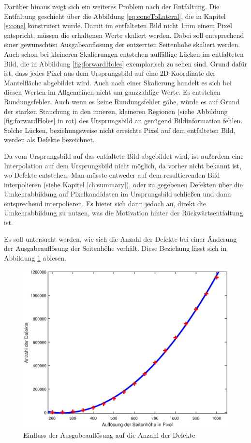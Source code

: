 Darüber hinaus zeigt sich ein weiteres Problem nach der Entfaltung. Die Entfaltung geschieht über die Abbildung \ref{eq:coneToLateral}, die in Kapitel \ref{s:cone} konstruiert wurde.
Damit im entfalteten Bild nicht 1mm einem Pixel entspricht, müssen die erhaltenen Werte skaliert werden. Dabei soll entsprechend einer gewünschten Ausgabeauflösung der entzerrten Seitenhöhe skaliert werden.
Auch schon bei kleineren Skalierungen entstehen auffällige Lücken im entfalteten Bild, die in Abbildung \ref{fig:forwardHoles} exemplarisch zu sehen sind. Grund dafür ist, dass jedes Pixel aus dem Ursprungsbild auf eine 2D-Koordinate der Mantelfläche abgebildet wird. Auch nach einer Skalierung handelt es sich bei diesen Werten im Allgemeinen nicht um ganzzahlige Werte. Es entstehen Rundungsfehler. Auch wenn es keine Rundungsfehler gäbe, würde es auf Grund der starken Stauchung in den inneren, kleineren Regionen (siehe Abbildung \ref{fig:forwardHoles} in rot) des Ursprungsbild an genügend Bildinformation fehlen. Solche Lücken, beziehungsweise nicht erreichte Pixel auf dem entfalteten Bild, werden als Defekte bezeichnet.

Da vom Ursprungsbild auf das entfaltete Bild abgebildet wird, ist außerdem eine Interpolation auf dem Ursprungsbild nicht möglich, da vorher nicht bekannt ist, wo Defekte entstehen. Man müsste entweder auf dem resultierenden Bild interpolieren (siehe Kapitel \ref{ch:summary}), oder zu gegebenen Defekten über die Umkehrabbildung auf Pixelkandidaten im Ursprungsbild schließen und dann entsprechend interpolieren.
Es bietet sich dann jedoch an, direkt die Umkehrabbildung zu nutzen, was die Motivation hinter der Rückwärtsentfaltung ist.

Es soll untersucht werden, wie sich die Anzahl der Defekte bei einer Änderung der Ausgabeauflösung der Seitenhöhe verhält. Diese Beziehung lässt sich in Abbildung \ref{fig:influenceRes} ablesen.
\begin{figure}[!htb]
	\centering
	\includegraphics[width=\textwidth]{images/numberOfHoles.eps}
	\caption{Einfluss der Ausgabeauflösung auf die Anzahl der Defekte}
	\label{fig:influenceRes}
\end{figure}

